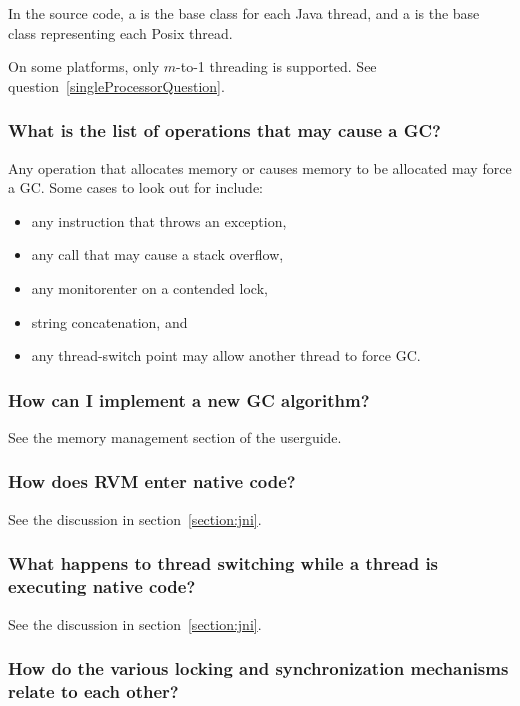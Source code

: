 In the source code, a 
is the base class for each Java
thread, and a 
is the base class representing each
Posix thread.  

On some platforms, only $m$-to-1 threading is supported.  See 
question~\ref{singleProcessorQuestion}.

\subsubsection{What is the list of operations that may cause a GC?}

Any operation that allocates memory or causes memory to be allocated may
force a GC.  Some cases to look out for include:
\begin{itemize}
\item any instruction that throws an exception,
\item any call that may cause a stack overflow,
\item any monitorenter on a contended lock,
\item string concatenation, and
\item any thread-switch point may allow another thread to force GC.
\end{itemize}

\subsubsection{How can I implement a new GC algorithm?}

See the memory management section of the userguide.

\subsubsection{How does RVM enter native code?}

See the discussion in section~\ref{section:jni}. 

\subsubsection{What happens to thread switching while a thread is
executing native code?}
See the discussion in section~\ref{section:jni}. 

\subsubsection{How do the various locking and synchronization mechanisms
relate to each other?}

